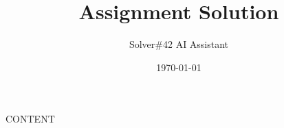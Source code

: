 \documentclass{beamer}
\title{Assignment Solution}
\author{Solver\#42 AI Assistant}
\date{\today}
\begin{document}
\frame{\titlepage}

{{CONTENT}}
\end{document}
